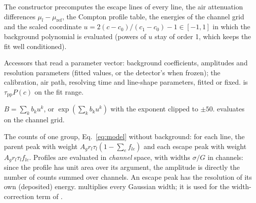 The constructor precomputes the escape lines of every line, the air attenuation differences
$\mu_l-\mu_\mathrm{ref}$, the Compton profile table, the energies of the channel grid and the
scaled coordinate $u = 2(c-c_0)/(c_1-c_0) - 1 \in [-1,1]$ in which the background polynomial
is evaluated (powers of $u$ stay of order 1, which keeps the fit well conditioned).

Accessors that read a parameter vector: background coefficients, amplitudes and resolution
parameters (fitted values, or the detector's when frozen); the calibration, air path,
resolving time and line-shape parameters, fitted or fixed.  is
$\tau_\mathrm{pp}P(c)$ on the fit range.

$B = \sum_k b_k u^k$, or $\exp(\sum_k b_k u^k)$ with the exponent clipped to $\pm50$.
 evaluates  on the channel grid.

The counts of one group, Eq.~\eqref{eq:model} without background: for each line, the parent
peak with weight $A_g r_l\tau_l(1-\sum_e f_{le})$ and each escape peak with weight
$A_g r_l\tau_l f_{le}$. Profiles are evaluated in \emph{channel} space, with widths
$\sigma/G$ in channels: since the profile has unit area over its argument, the amplitude is
directly the number of counts summed over channels. An escape peak has the resolution of its
own (deposited) energy.  multiplies every Gaussian width; it is used for the
width-correction term of .

